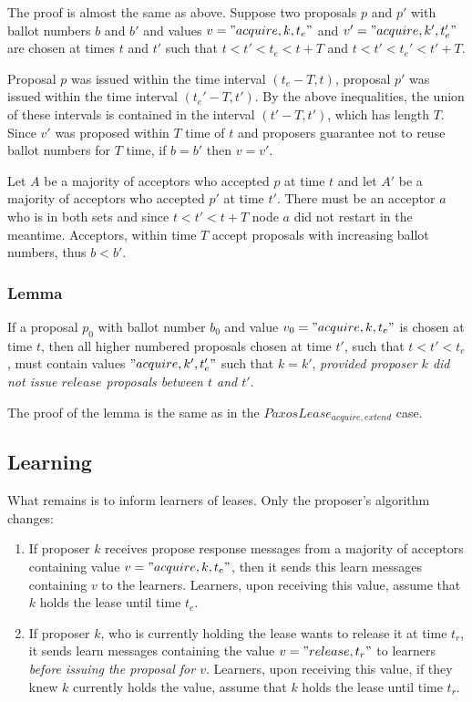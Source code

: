 \documentclass[12pt]{amsart}
\begin{document}
The proof is almost the same as above. Suppose two proposals $p$ and $p'$ with ballot numbers $b$ and $b'$ and values $v = "acquire, k, t_e"$ and $v' = "acquire, k', t_e'"$ are chosen at times $t$ and $t'$ such that $t < t' < t_e < t + T$ and $t < t' < t_e' < t' + T$.

Proposal $p$ was issued within the time interval $(t_e - T, t)$, proposal $p'$ was issued within the time interval $(t_e' - T, t')$. By the above inequalities, the union of these intervals is contained in the interval $(t' - T, t')$, which has length $T$. Since $v'$ was proposed within $T$ time of $t$ and proposers guarantee not to reuse ballot numbers for $T$ time, if $b = b'$ then $v = v'$.

Let $A$ be a majority of acceptors who accepted $p$ at time $t$ and let $A'$ be a majority of acceptors who accepted $p'$ at time $t'$.  There must be an acceptor $a$ who is in both sets and since $t < t' < t + T$ node $a$ did not restart in the meantime. Acceptors, within time $T$ accept proposals with increasing ballot numbers, thus $b < b'$.

\subsubsection{ Lemma } If a proposal $p_0$ with ballot number $b_0$ and value $v_0 = "acquire, k, t_e"$ is chosen at time $t$, then all higher numbered proposals chosen at time $t'$, such that $t < t' < t_e$, must contain values $"acquire, k', t_e'"$ such that $k = k'$, \emph{provided proposer $k$ did not issue $release$ proposals between $t$ and $t'$}.

The proof of the lemma is the same as in the $PaxosLease_{acquire, extend}$ case.

\subsection{ Learning }

What remains is to inform learners of leases. Only the proposer's algorithm changes:

\begin{enumerate}

\item If proposer $k$ receives propose response messages from a majority of acceptors containing value $v = "acquire, k, t_e"$, then it sends this learn messages containing $v$ to the learners. Learners, upon receiving this value, assume that $k$ holds the lease until time $t_e$.

\item If proposer $k$, who is currently holding the lease wants to release it at time $t_r$, it sends learn messages containing the value $v = "release, t_r"$ to learners \emph{before issuing the proposal for $v$}. Learners, upon receiving this value, if they knew $k$ currently holds the value, assume that $k$ holds the lease until time $t_r$.

\end{enumerate}
\end{document}
